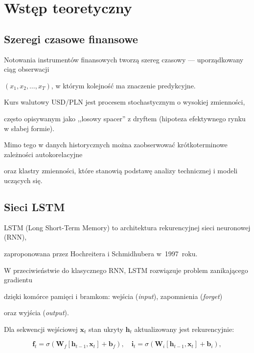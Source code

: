 \documentclass[12pt,a4paper]{report}
\begin{document}

\chapter{Wstęp teoretyczny}




\section{Szeregi czasowe finansowe}



Notowania instrumentów finansowych tworzą szereg czasowy --- uporządkowany ciąg obserwacji

$(x_1, x_2, \ldots, x_T)$, w którym kolejność ma znaczenie predykcyjne.

Kurs walutowy USD/PLN jest procesem stochastycznym o wysokiej zmienności,

często opisywanym jako ,,losowy spacer'' z dryftem (hipoteza efektywnego rynku w słabej formie).

Mimo tego w danych historycznych można zaobserwować krótkoterminowe zależności autokorelacyjne

oraz klastry zmienności, które stanowią podstawę analizy technicznej i modeli uczących się.



\section{Sieci LSTM}



LSTM (Long Short-Term Memory) to architektura rekurencyjnej sieci neuronowej (RNN),

zaproponowana przez Hochreitera i Schmidhubera w~1997~roku.

W przeciwieństwie do klasycznego RNN, LSTM rozwiązuje problem zanikającego gradientu

dzięki komórce pamięci i bramkom: wejścia (\emph{input}), zapomnienia (\emph{forget})

oraz wyjścia (\emph{output}).



Dla sekwencji wejściowej $\mathbf{x}_t$ stan ukryty $\mathbf{h}_t$ aktualizowany jest rekurencyjnie:

\begin{equation}

    \mathbf{f}_t = \sigma(\mathbf{W}_f [\mathbf{h}_{t-1}, \mathbf{x}_t] + \mathbf{b}_f), \quad

    \mathbf{i}_t = \sigma(\mathbf{W}_i [\mathbf{h}_{t-1}, \mathbf{x}_t] + \mathbf{b}_i),

\end{equation}
\end{document}
